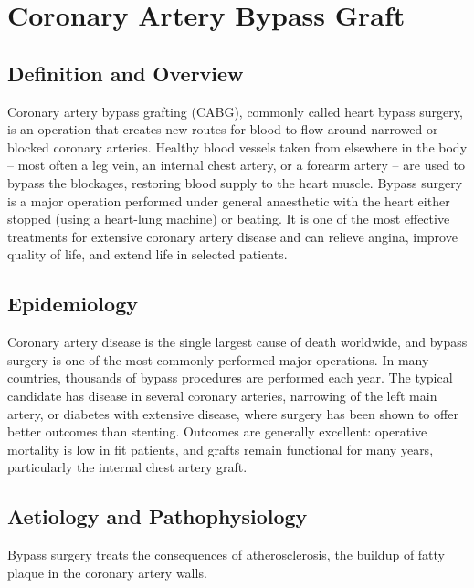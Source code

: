 \chapter{Coronary Artery Bypass Graft}

\section*{Definition and Overview}
Coronary artery bypass grafting (CABG), commonly called heart bypass surgery, is an operation that creates new routes for blood to flow around narrowed or blocked coronary arteries. Healthy blood vessels taken from elsewhere in the body -- most often a leg vein, an internal chest artery, or a forearm artery -- are used to bypass the blockages, restoring blood supply to the heart muscle. Bypass surgery is a major operation performed under general anaesthetic with the heart either stopped (using a heart-lung machine) or beating. It is one of the most effective treatments for extensive coronary artery disease and can relieve angina, improve quality of life, and extend life in selected patients.

\section*{Epidemiology}
Coronary artery disease is the single largest cause of death worldwide, and bypass surgery is one of the most commonly performed major operations. In many countries, thousands of bypass procedures are performed each year. The typical candidate has disease in several coronary arteries, narrowing of the left main artery, or diabetes with extensive disease, where surgery has been shown to offer better outcomes than stenting. Outcomes are generally excellent: operative mortality is low in fit patients, and grafts remain functional for many years, particularly the internal chest artery graft.

\section*{Aetiology and Pathophysiology}
Bypass surgery treats the consequences of atherosclerosis, the buildup of fatty plaque in the coronary artery walls.

